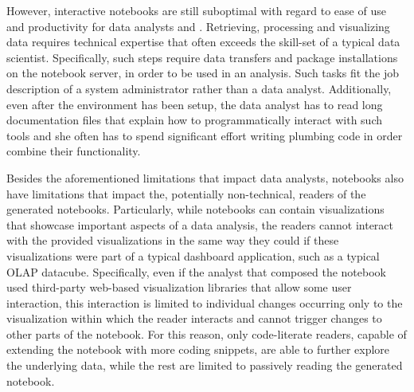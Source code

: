 However, interactive notebooks are still suboptimal with regard to ease of use and productivity for data analysts and . 
Retrieving, processing and visualizing data requires technical expertise that often exceeds the skill-set of a typical data scientist. Specifically, such steps require data transfers and package installations on the notebook server, in order to be used in an analysis. Such tasks fit the job description of a system administrator  rather than a data analyst. Additionally, even after the environment has been setup, the data analyst has to read long documentation files that explain how to programmatically interact with such tools and she often has to spend significant effort writing plumbing code in order combine their functionality.

Besides the aforementioned limitations that impact data analysts, notebooks also have limitations that impact the, potentially non-technical, readers of the generated notebooks. Particularly, while notebooks can contain visualizations that showcase important aspects of a data analysis, the readers cannot interact with the provided visualizations in the same way they could if these visualizations were part of a typical dashboard application, such as a typical OLAP datacube.  Specifically, even if the analyst that composed the notebook used third-party web-based visualization libraries that allow some user interaction, this interaction is limited to individual changes occurring only to the visualization within which the reader interacts and cannot trigger changes to other parts of the notebook. For this reason, only code-literate readers, capable of extending the notebook with more coding snippets, are able to further explore the underlying data, while the rest are limited to passively reading the generated notebook.\\




